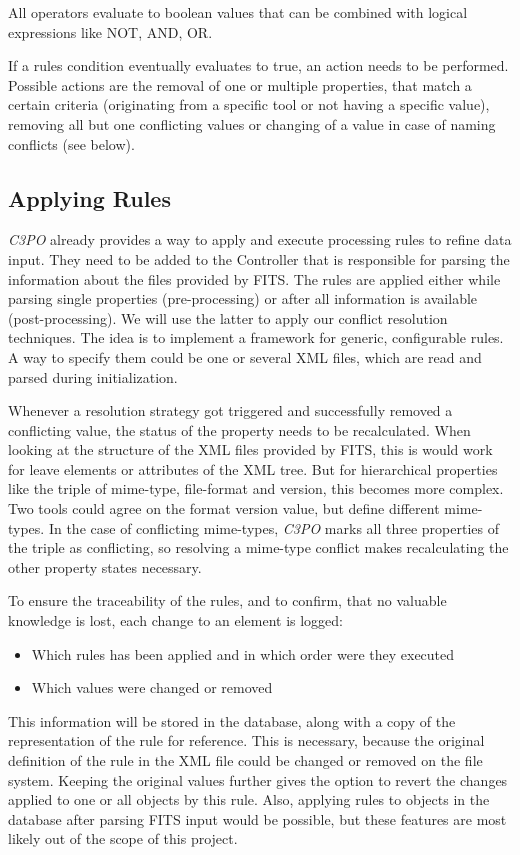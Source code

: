 \documentclass[a4paper,12pt]{article}
\begin{document}
All operators evaluate to boolean values that can be combined with logical expressions like NOT, AND, OR.

If a rules condition eventually evaluates to true, an action needs to be performed. Possible actions are the removal of one or multiple properties, that match a certain criteria (originating from a specific tool or not having a specific value), removing all but one conflicting values or changing of a value in case of naming conflicts (see below). 

\subsection{Applying Rules}
\emph{C3PO} already provides a way to apply and execute processing rules to refine data input. They need to be added to the Controller that is responsible for parsing the information about the files provided by FITS. The rules are applied either while parsing single properties (pre-processing) or after all information is available (post-processing). We will use the latter to apply our conflict resolution techniques. The idea is to implement a framework for generic, configurable rules. A way to specify them could be one or several XML files, which are read and parsed during initialization. 

Whenever a resolution strategy got triggered and successfully removed a conflicting value, the status of the property needs to be recalculated. When looking at the structure of the XML files provided by FITS, this is would work for leave elements or attributes of the XML tree. But for hierarchical properties like the triple of mime-type, file-format and version, this becomes more complex. Two tools could agree on the format version value, but define different mime-types. In the case of conflicting mime-types, \emph{C3PO} marks all three properties of the triple as conflicting, so resolving a mime-type conflict makes recalculating the other property states necessary.

To ensure the traceability of the rules, and to confirm, that no valuable knowledge is lost, each change to an element is logged:
\begin{itemize}
\item Which rules has been applied and in which order were they executed
\item Which values were changed or removed
\end{itemize}

This information will be stored in the database, along with a copy of the representation of the rule for reference. This is necessary, because the original definition of the rule in the XML file could be changed or removed on the file system. Keeping the original values further gives the option to revert the changes applied to one or all objects by this rule. Also, applying rules to objects in the database after parsing FITS input would be possible, but these features are most likely out of the scope of this project.
\end{document}

